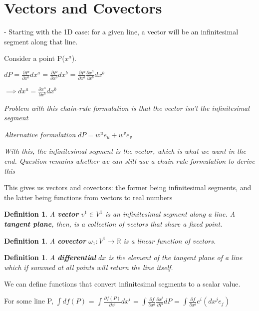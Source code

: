\documentclass{book}
\newtheorem{defn}[equation]{Definition}
\begin{document}
\section{Vectors and Covectors}

- Starting with the 1D case: for a given line, a vector will be an infinitesimal segment along that line. 


Consider a point P($x^a$).
 
$dP = \frac{\partial P}{\partial x^a} dx^a = \frac{\partial P}{\partial x^b} dx^b = \frac{\partial P}{\partial x^a}\frac{\partial x^a}{\partial x^b} dx^b$

$\implies dx^a = \frac{\partial x^a}{\partial x^b}dx^b $

\emph{Problem with this chain-rule formulation is that the vector isn't the infinitesimal segment}

\emph{Alternative formulation}
$dP = w^ue_u + w^ve_v$

\emph{With this, the infinitesimal segment is the vector, which is what we want in the end. Question remains whether we can still use a chain rule formulation to derive this}

This gives us vectors and covectors: the former being infinitesimal segments, and the latter being functions from vectors to real numbers



\begin{defn}
	A \textbf{vector} $v^1 \in V^1$ is an infinitesimal segment along a line. A \textbf{tangent plane}, then, is a collection of vectors that share a fixed point. 
\end{defn}


\begin{defn}
	A \textbf{covector} $\omega_1 : V^1 \to \mathbb{R}$ is a linear function of vectors. 
\end{defn}



\begin{defn}
	A \textbf{differential} $dx$ is the element of the tangent plane of a line which if summed at all points will return the line itself. 
\end{defn}

We can define functions that convert infinitesimal segments to a scalar value. 

For some line P, $\int df(P)$ = $\int \frac{\partial f(P)}{{\partial x^i}} dx^i$ = $\int \frac{\partial f}{\partial x^i}\frac{\partial x^i}{\partial P}dP$ = $\int \frac{{\partial f}}{{\partial x^i}} e^i (dx^j e_j)$
\end{document}
